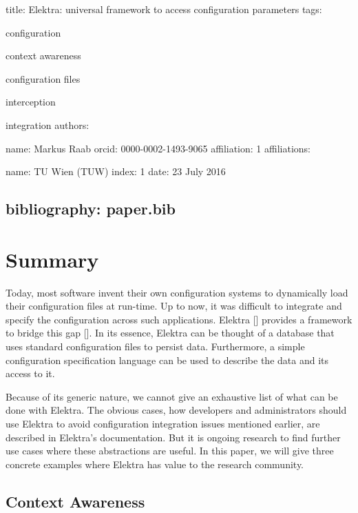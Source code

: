 

 title\+: \textquotesingle{}Elektra\+: universal framework to access configuration parameters\textquotesingle{} tags\+:
\begin{DoxyItemize}
\item configuration
\item context awareness
\item configuration files
\item interception
\item integration authors\+:
\end{DoxyItemize}

name\+: Markus Raab orcid\+: 0000-\/0002-\/1493-\/9065 affiliation\+: 1 affiliations\+:
\begin{DoxyItemize}
\item name\+: TU Wien (T\+UW) index\+: 1 date\+: 23 July 2016 \subsection*{bibliography\+: paper.\+bib }
\end{DoxyItemize}\hypertarget{md_doc_paper_paper_doc_paper_paper_md}{}\section{Summary}\label{md_doc_paper_paper_doc_paper_paper_md}
Today, most software invent their own configuration systems to dynamically load their configuration files at run-\/time. Up to now, it was difficult to integrate and specify the configuration across such applications. Elektra \mbox{[}\mbox{]} provides a framework to bridge this gap \mbox{[}\mbox{]}. In its essence, Elektra can be thought of a database that uses standard configuration files to persist data. Furthermore, a simple configuration specification language can be used to describe the data and its access to it.

Because of its generic nature, we cannot give an exhaustive list of what can be done with Elektra. The obvious cases, how developers and administrators should use Elektra to avoid configuration integration issues mentioned earlier, are described in Elektra’s documentation. But it is ongoing research to find further use cases where these abstractions are useful. In this paper, we will give three concrete examples where Elektra has value to the research community.

\subsection*{Context Awareness}

